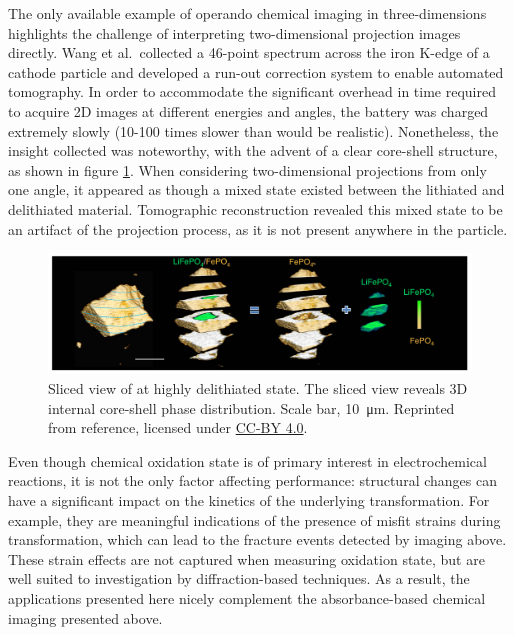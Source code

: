 \documentclass[journal=cmatex,manuscript=perspective]{achemso}
\begin{document}
The only available example of operando chemical imaging in
three-dimensions highlights the challenge of interpreting
two-dimensional projection images directly. Wang et al.\ collected a
46-point spectrum across the iron K-edge of a  cathode
particle and developed a run-out correction system to enable automated
tomography. In order to accommodate the significant overhead in time
required to acquire 2D images at different energies and angles, the
battery was charged extremely slowly (10-100 times slower than would
be realistic). Nonetheless, the insight collected was noteworthy, with
the advent of a clear core-shell structure, as shown in figure
\ref{figure:wang2016}. When considering two-dimensional projections
from only one angle, it appeared as though a mixed state existed
between the lithiated and delithiated material. Tomographic
reconstruction revealed this mixed state to be an artifact of the
projection process, as it is not present anywhere in the
particle\cite{wang2016}.

\begin{figure}
  \includegraphics[width=\textwidth]{wang2016.png}
  \caption{Sliced view of  at highly delithiated
    state. The sliced view reveals 3D internal core-shell phase
    distribution. Scale bar, \SI{10}{\micro\metre}. Reprinted from
    reference\cite{wang2016}, licensed under
    \href{https://creativecommons.org/licenses/by/4.0/}{CC-BY 4.0}.}
  \label{figure:wang2016}
\end{figure}

Even though chemical oxidation state is of primary interest in
electrochemical reactions, it is not the only factor affecting
performance: structural changes can have a significant impact on the
kinetics of the underlying transformation. For example, they are
meaningful indications of the presence of misfit strains during
transformation, which can lead to the fracture events detected by
imaging above\cite{woodford2012}.
These strain effects are not captured when measuring oxidation state,
but are well suited to investigation by diffraction-based
techniques. As a result, the applications presented here nicely
complement the absorbance-based chemical imaging presented above.
\end{document}
